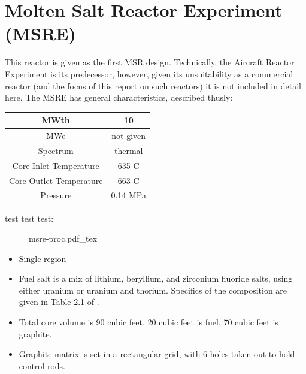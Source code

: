 \documentclass[letterpaper]{article}
\begin{document}
\section{Molten Salt Reactor Experiment (MSRE)}
This reactor is given as the first MSR design.  Technically, the Aircraft Reactor Experiment is its predecessor, however, given its unsuitability as a commercial reactor (and the focus of this report on such reactors) it is not included in detail here.  The MSRE has general characteristics, described thusly: \cite{robertson_msre_1965}

\begin{center}
\begin{tabular}{|c|c|}
\hline
MWth & 10\\
\hline
MWe & not given \\
\hline
Spectrum & thermal \\
\hline
Core Inlet Temperature & 635 C \\
\hline
Core Outlet Temperature & 663 C\\
\hline
Pressure & 0.14 MPa \\
\hline
\end{tabular}
\end{center}

test test test:
\begin{figure}
    \centering
    \def\svgwidth{\columnwidth}
    {msre-proc.pdf_tex}
\end{figure}

\begin{itemize}
\item Single-region
\item Fuel salt is a mix of lithium, beryllium, and zirconium fluoride salts, using either uranium or uranium and thorium.  Specifics of the composition are given in Table 2.1 of \cite{robertson_msre_1965}.
\item Total core volume is 90 cubic feet.  20 cubic feet is fuel, 70 cubic feet is graphite.
\item Graphite matrix is set in a rectangular grid, with 6 holes taken out to hold control rods.
\end{itemize}
\end{document}
